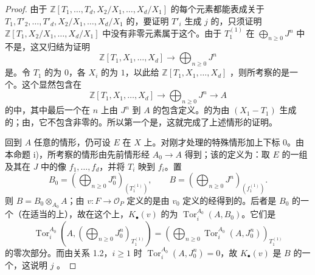 \begin{proof}
由于 $\mathbb Z[T_1,\ldots,T_d,X_2/X_1,\ldots,X_d/X_1]$ 的每个元素都能表成关于 $T_1,T'_2,\ldots,T'_d,X_2/X_1,\ldots,X_d/X_1$ 的，要证明 $T'_i$ 生成 $j$ 的，只须证明 $\mathbb Z[T_1,X_2/X_1,\ldots,X_d/X_1]$ 中没有非零元素属于这个。由于 $T_1^{(1)}$ 在 $\bigoplus_{n\geq0}J^n$ 中不是，这又归结为证明
\[
\mathbb Z[T_1,X_1,\ldots,X_d]\longrightarrow\bigoplus_{n\geq0}J^n
\]
是。令 $T_1$ 的为 $0$，各 $X_i$ 的为 $1$，以此给 $\mathbb Z[T_1,X_1,\ldots,X_d]$ ，则所考察的是一个。这个显然包含在
\[
\mathbb Z[T_1,X_1,\ldots,X_d]\longrightarrow\bigoplus_{n\geq0}J^n\longrightarrow A
\]
的中，其中最后一个在 $n$ 上由 $J^n$ 到 $A$ 的包含定义。的为由 $(X_1-T_1)$ 生成的；由，它不包含非零的。所以第一个是，这就完成了上述情形的证明。

回到 $A$ 任意的情形，仍可设 $E$ 在 $X$ 上。对刚才处理的特殊情形加上下标 $0$。由本命题 i)，所考察的情形由先前情形经 $A_0\to A$ 得到；该的定义为：取 $E$ 的一组及其在 $J$ 中的像 $f_1,\ldots,f_d$，并将 $T_i$ 映到 $f_i$。置
\[
B_0=\left(\bigoplus_{n\geq0}J_0^n\right)_{(T_1^{(1)})},\qquad
B=\left(\bigoplus_{n\geq0}J^n\right)_{(f_1^{(1)})}.
\]
则 $B=B_0\otimes_{A_0}A$；由 $v:F\to\mathcal O_P$ 定义的是由 $v_0$ 定义的经得到的。后者是 $B_0$ 的一个（在适当的上），故在这个上，$K_\bullet(v)$ 的为 $\operatorname{Tor}_i^{A_0}(A,B_0)$。它们是
\[
\operatorname{Tor}_i^{A_0}\left(A,\left(\bigoplus_{n\geq0}J_0^n\right)_{T_1^{(1)}}\right)
=\left(\bigoplus_{n\geq0}\operatorname{Tor}_i^{A_0}(A,J_0^n)\right)_{T_1^{(1)}}
\]
的零次部分。而由关系 1.2，$i\geq1$ 时 $\operatorname{Tor}_i^{A_0}(A,J_0^n)=0$，故 $K_\bullet(v)$ 是 $B$ 的一个，这说明 $j$ 。


\end{proof}
